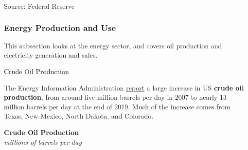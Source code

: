 \documentclass{report}
\makeatletter
\newcommand{\tbllink}[1]{\href{https://raw.githubusercontent.com/bdecon/US-chartbook/master/chartbook/data/#1}{\faTable}}
\newcommand*\short[1]{\expandafter\@gobbletwo\number\numexpr#1\relax}
\newcommand{\absnode}[3]{\node[below right, align=left] at (axis cs: #1,#2) {#3};}
\newcommand{\dateaxisticks}{
		date coordinates in=x, axis line style={draw=none},
		xmax={2024-01-31},
		max space between ticks=40,	    
		xtick={{1990-01-01}, {1992-01-01}, {1994-01-01}, 
			{1996-01-01}, {1998-01-01}, {2000-01-01}, 
			{2002-01-01}, {2004-01-01}, {2006-01-01},
			{2008-01-01}, {2010-01-01}, {2012-01-01}, {2014-01-01},
		    {2016-01-01}, {2018-01-01}, {2020-01-01}, {2022-01-01}, 
		    {2024-01-01}, {2026-01-01}},
		minor xtick={{1989-01-01}, {1991-01-01}, {1993-01-01},
			{1995-01-01}, {1997-01-01}, {1999-01-01}, 
			{2001-01-01}, {2003-01-01}, {2005-01-01}, {2007-01-01},
		    {2009-01-01}, {2011-01-01}, {2013-01-01}, {2015-01-01},
		    {2017-01-01}, {2019-01-01}, {2021-01-01}, {2023-01-01}, 
		    {2025-01-01}, {2027-01-01}},
		enlarge y limits={0.06}, enlarge x limits={0.01},
		xticklabel style={align=center, yshift=-2pt}, tick label style={inner sep=0pt},
		}
\newcommand{\bbar}[2]{extra #1 ticks = {{#2}}, extra #1 tick labels = ,
		extra #1 tick style = {grid=major, grid style={thick, black!25}},}
\newcommand{\stdline}[4]{\addplot[very thick, no markers, color=#1] 
		table [x=#2, y=#3, col sep=comma] {#4};	}
\newcommand{\thinline}[4]{\addplot[no markers, color=#1] 
		table [x=#2, y=#3, col sep=comma] {#4};	}
\newcommand{\rbars}{
		\fill[color=black!10] (axis cs:{1990-07-01},\pgfkeysvalueof{/pgfplots/ymin})
			rectangle (axis cs:{1991-03-01}, \pgfkeysvalueof{/pgfplots/ymax});
		\fill[color=black!10] (axis cs:{2007-12-01},\pgfkeysvalueof{/pgfplots/ymin})
			rectangle (axis cs:{2009-07-01}, \pgfkeysvalueof{/pgfplots/ymax});
		\fill[color=black!10] (axis cs:{2001-03-01},\pgfkeysvalueof{/pgfplots/ymin})
			rectangle (axis cs:{2001-11-01}, \pgfkeysvalueof{/pgfplots/ymax});
		\fill[color=black!10] (axis cs:{2020-02-01},\pgfkeysvalueof{/pgfplots/ymin})
			rectangle (axis cs:{2020-05-01}, \pgfkeysvalueof{/pgfplots/ymax});}
\makeatother
\begin{document}
{\begin{minipage}{1.0\textwidth}
\hspace{2mm} 

\footnotesize{Source: Federal Reserve} \hfill \tbllink{tcu.csv}
\end{minipage}
\newpage
\vspace*{-10mm}

\subsubsection*{Energy Production and Use} \vspace{-4mm}

\begin{minipage}{1.0\textwidth}  
\small This subsection looks at the energy sector, and covers oil production and electricity generation and sales. 

\normalsize Crude Oil Production
\vspace{-1mm}

\small The Energy Information Administration \href{https://www.eia.gov/dnav/pet/pet_crd_crpdn_adc_mbblpd_m.htm}{report} a large increase in US \textbf{crude oil production}, from around five million barrels per day in 2007 to nearly 13 million barrels per day at the end of 2019. Much of the increase comes from Texas, New Mexico, North Dakota, and Colorado. 
\vspace{1mm}

\normalsize \textbf{Crude Oil Production}\\
\footnotesize{\textit{millions of barrels per day}}
\vspace{4.7cm}


\end{minipage}}
\end{document}
